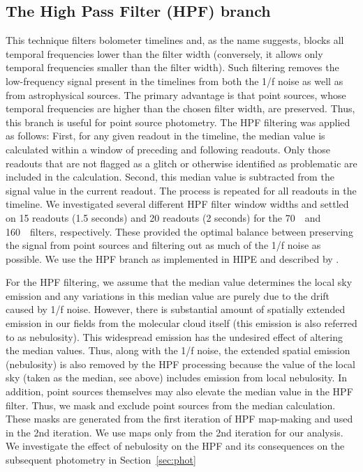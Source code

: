 \documentclass[manuscript]{aastex}
\begin{document}
\subsection{The High Pass Filter (HPF) branch}
\par
This technique filters bolometer timelines and, as the name suggests, blocks all temporal frequencies lower than the filter width (conversely, it allows only temporal frequencies smaller than the filter width).  Such filtering removes the low-frequency signal present in the timelines from both the 1/f noise as well as from astrophysical sources.  The primary advantage is that point sources, whose temporal frequencies are higher than the chosen filter width, are preserved.  Thus, this branch is useful for point source photometry.  The HPF filtering was applied as follows:  First, for any given readout in the timeline, the median value is calculated within a window of preceding and following readouts.  Only those readouts that are not flagged as a glitch or otherwise identified as problematic are included in the calculation.  Second, this median value is subtracted from the signal value in the current readout.  The process is repeated for all readouts in the timeline.  We investigated several different HPF filter window widths and settled on 15 readouts (1.5 seconds) and 20 readouts (2 seconds) for the 70~\micron\ and 160~\micron\ filters, respectively.  These provided the optimal balance between preserving the signal from point sources and filtering out as much of the 1/f noise as possible.  We use the HPF branch as implemented in HIPE and described by \cite{hpf}.
\par
For the HPF filtering, we assume that the median value determines the local sky emission and any variations in this median value are purely due to the drift caused by 1/f noise.  However, there is substantial amount of spatially extended emission in our fields from the molecular cloud itself (this emission is also referred to as nebulosity).  This widespread emission has the undesired effect of altering the median values.  Thus, along with the 1/f noise, the extended spatial emission (nebulosity) is also removed by the HPF processing  because the value of the local sky (taken as the median, see above) includes emission from local nebulosity.  In addition, point sources themselves may also elevate the median value in the HPF filter.  Thus, we mask and exclude point sources from the median calculation.  These masks are generated from the first iteration of HPF map-making and used in the 2nd iteration.  We use maps only from the 2nd iteration for our analysis.  We investigate the effect of nebulosity on the HPF and its consequences on the subsequent photometry in Section~\ref{sec:phot}
\end{document}
